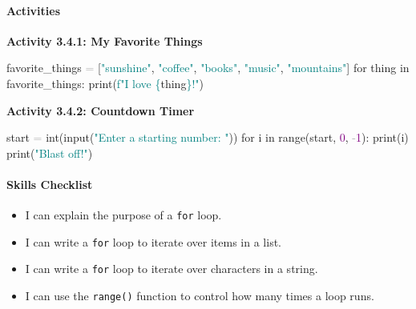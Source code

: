 \documentclass[
  justified,
  openright,
]{tufte-book}
\let\subsubsection\paragraph
\let\paragraph\paragraph
\newcommand{\BuiltInTok}[1]{#1}
\newcommand{\ControlFlowTok}[1]{\textcolor{BrandBlue}{#1}}
\newcommand{\DecValTok}[1]{\textcolor{Purple}{#1}}
\newcommand{\KeywordTok}[1]{\textcolor{BrandBlue}{#1}}
\newcommand{\NormalTok}[1]{#1}
\newcommand{\OperatorTok}[1]{\textcolor{DarkGray}{#1}}
\newcommand{\SpecialCharTok}[1]{\textcolor{Teal}{#1}}
\newcommand{\SpecialStringTok}[1]{\textcolor{Teal}{#1}}
\newcommand{\StringTok}[1]{\textcolor{Teal}{#1}}
\newenvironment{Shaded}{%
  \begin{snugshade}
}{%
  \end{snugshade}
}
\let\subsubsection\paragraph
\let\paragraph\paragraph
\providecommand{\tightlist}{%
  \setlength{\itemsep}{0pt}\setlength{\parskip}{0pt}}
\begin{document}
\subsubsection{Activities}\label{activities-10}

\textbf{Activity 3.4.1: My Favorite Things}

\begin{Shaded}
\begin{Highlighting}[]
\NormalTok{favorite\_things }\OperatorTok{=}\NormalTok{ [}\StringTok{"sunshine"}\NormalTok{, }\StringTok{"coffee"}\NormalTok{, }\StringTok{"books"}\NormalTok{, }\StringTok{"music"}\NormalTok{, }\StringTok{"mountains"}\NormalTok{]}
\ControlFlowTok{for}\NormalTok{ thing }\KeywordTok{in}\NormalTok{ favorite\_things:}
    \BuiltInTok{print}\NormalTok{(}\SpecialStringTok{f"I love }\SpecialCharTok{\{}\NormalTok{thing}\SpecialCharTok{\}}\SpecialStringTok{!"}\NormalTok{)}
\end{Highlighting}
\end{Shaded}

\textbf{Activity 3.4.2: Countdown Timer}

\begin{Shaded}
\begin{Highlighting}[]
\NormalTok{start }\OperatorTok{=} \BuiltInTok{int}\NormalTok{(}\BuiltInTok{input}\NormalTok{(}\StringTok{"Enter a starting number: "}\NormalTok{))}
\ControlFlowTok{for}\NormalTok{ i }\KeywordTok{in} \BuiltInTok{range}\NormalTok{(start, }\DecValTok{0}\NormalTok{, }\OperatorTok{{-}}\DecValTok{1}\NormalTok{):}
    \BuiltInTok{print}\NormalTok{(i)}
\BuiltInTok{print}\NormalTok{(}\StringTok{"Blast off!"}\NormalTok{)}
\end{Highlighting}
\end{Shaded}

\subsubsection{Skills Checklist}\label{skills-checklist-15}

\begin{itemize}
\tightlist
\item[$\square$]
  I can explain the purpose of a \texttt{for} loop.
\item[$\square$]
  I can write a \texttt{for} loop to iterate over items in a list.
\item[$\square$]
  I can write a \texttt{for} loop to iterate over characters in a
  string.
\item[$\square$]
  I can use the \texttt{range()} function to control how many times a
  loop runs.
\end{itemize}
\end{document}
